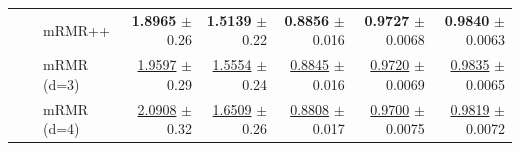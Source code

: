 \begin{longtable}{llp{}rrrrr}
 &  & mRMR++ & \textbf{1.8965} {\scriptsize $\pm$ 0.26} & \textbf{1.5139} {\scriptsize $\pm$ 0.22} & \textbf{0.8856} {\scriptsize $\pm$ 0.016} & \textbf{0.9727} {\scriptsize $\pm$ 0.0068} & \textbf{0.9840} {\scriptsize $\pm$ 0.0063} \\
 &  & mRMR (d=3) & \underline{1.9597} {\scriptsize $\pm$ 0.29} & \underline{1.5554} {\scriptsize $\pm$ 0.24} & \underline{0.8845} {\scriptsize $\pm$ 0.016} & \underline{0.9720} {\scriptsize $\pm$ 0.0069} & \underline{0.9835} {\scriptsize $\pm$ 0.0065} \\
 &  & mRMR (d=4) & \underline{2.0908} {\scriptsize $\pm$ 0.32} & \underline{1.6509} {\scriptsize $\pm$ 0.26} & \underline{0.8808} {\scriptsize $\pm$ 0.017} & \underline{0.9700} {\scriptsize $\pm$ 0.0075} & \underline{0.9819} {\scriptsize $\pm$ 0.0072} \\
\end{longtable}